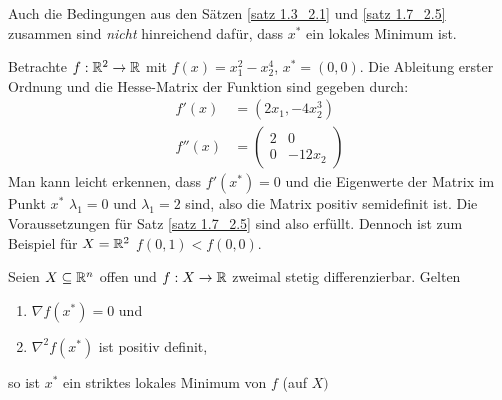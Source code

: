 Auch die Bedingungen aus den Sätzen \ref{satz 1.3_2.1} und \ref{satz 1.7_2.5} zusammen sind \textit{nicht} hinreichend dafür, dass $x^\ast$ ein lokales Minimum ist.

\begin{beispiel}
	Betrachte $ f: \mathbb{R}^{2} \to \mathbb{R} $ mit $f(x) = x_{1}^{2} - x_{2}^{4}$, $x^\ast =(0,0)$. Die Ableitung erster Ordnung und die Hesse-Matrix der Funktion sind gegeben durch: 
	\begin{align*}
		f'(x) &= (2x_{1} , -4x_{2}^{3}) \\
		f''(x) &= \begin{pmatrix} 2 & 0 \\ 0 & -12 x_{2} \end{pmatrix}
	\end{align*}
	Man kann leicht erkennen, dass $f'(x^\ast)=0$ und die Eigenwerte der Matrix im Punkt $x^\ast$ $ \lambda_{1} =0$ und $\lambda_{1} =2$ sind, also die Matrix positiv semidefinit ist. Die Voraussetzungen für Satz \ref{satz 1.7_2.5} sind also erfüllt. Dennoch ist zum Beispiel für $X = \mathbb{R}^{2}$ $f(0,1) < f(0,0)$. 
\end{beispiel}

\begin{satz} \label{satz 1.9_2.7}
	Seien $ X \subseteq \mathbb{R}^n $ offen und $ f:X \to \mathbb{R} $ zweimal stetig differenzierbar. Gelten
	\begin{enumerate}[label=(\alph*), nolistsep, topsep=-\parskip]
		\item $\nabla f(x^\ast) =0$ und 
		\item $\nabla^{2} f(x^\ast)$ ist positiv definit, 
	\end{enumerate}
	so ist $x^\ast$ ein striktes lokales Minimum von $f$ (auf $X)$
\end{satz}

